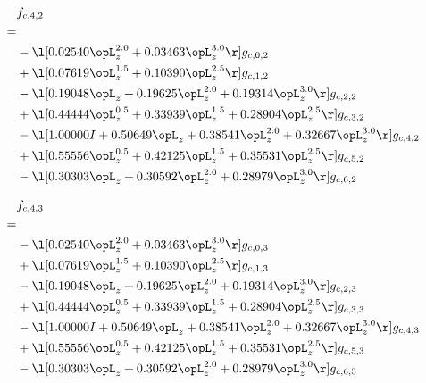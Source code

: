 \begin{alignat}{2} 
\label{eq:f_42_0} 
& f_{c,4,2} \nonumber \\ 
 = \\ 
& - \l[  0.02540 \opL_z^{2.0} +  0.03463 \opL_z^{3.0}  \r] g_{c,0,2} \nonumber \\ 
& + \l[  0.07619 \opL_z^{1.5} +  0.10390 \opL_z^{2.5}  \r] g_{c,1,2} \nonumber \\ 
& - \l[  0.19048 \opL_z +  0.19625 \opL_z^{2.0} +  0.19314 \opL_z^{3.0}  \r] g_{c,2,2} \nonumber \\ 
& + \l[  0.44444 \opL_z^{0.5} +  0.33939 \opL_z^{1.5} +  0.28904 \opL_z^{2.5}  \r] g_{c,3,2} \nonumber \\ 
& - \l[  1.00000 I +  0.50649 \opL_z +  0.38541 \opL_z^{2.0} +  0.32667 \opL_z^{3.0}  \r] g_{c,4,2} \nonumber \\ 
& + \l[  0.55556 \opL_z^{0.5} +  0.42125 \opL_z^{1.5} +  0.35531 \opL_z^{2.5}  \r] g_{c,5,2} \nonumber \\ 
& - \l[  0.30303 \opL_z +  0.30592 \opL_z^{2.0} +  0.28979 \opL_z^{3.0}  \r] g_{c,6,2} \nonumber \\ 
\end{alignat} 


\begin{alignat}{2} 
\label{eq:f_43_0} 
& f_{c,4,3} \nonumber \\ 
 = \\ 
& - \l[  0.02540 \opL_z^{2.0} +  0.03463 \opL_z^{3.0}  \r] g_{c,0,3} \nonumber \\ 
& + \l[  0.07619 \opL_z^{1.5} +  0.10390 \opL_z^{2.5}  \r] g_{c,1,3} \nonumber \\ 
& - \l[  0.19048 \opL_z +  0.19625 \opL_z^{2.0} +  0.19314 \opL_z^{3.0}  \r] g_{c,2,3} \nonumber \\ 
& + \l[  0.44444 \opL_z^{0.5} +  0.33939 \opL_z^{1.5} +  0.28904 \opL_z^{2.5}  \r] g_{c,3,3} \nonumber \\ 
& - \l[  1.00000 I +  0.50649 \opL_z +  0.38541 \opL_z^{2.0} +  0.32667 \opL_z^{3.0}  \r] g_{c,4,3} \nonumber \\ 
& + \l[  0.55556 \opL_z^{0.5} +  0.42125 \opL_z^{1.5} +  0.35531 \opL_z^{2.5}  \r] g_{c,5,3} \nonumber \\ 
& - \l[  0.30303 \opL_z +  0.30592 \opL_z^{2.0} +  0.28979 \opL_z^{3.0}  \r] g_{c,6,3} \nonumber \\ 
\end{alignat} 


